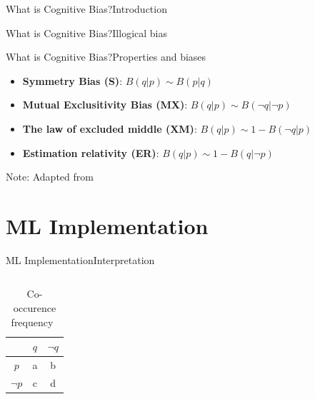 \documentclass[
	aspectratio=169,	%
	onlytextwidth,		%
	t,					%
	]{beamer}
\begin{document}
\begin{frame}[fragile]{What is Cognitive Bias?}{Introduction}
\begin{frame}[fragile]{What is Cognitive Bias?}{Illogical bias}
		 \newline

		 \newline

	\end{frame}

	\begin{frame}[fragile]{What is Cognitive Bias?}{Properties and biases}
		\vfill
	
		\begin{itemize}	
			
			\item<1-> \textbf{Symmetry Bias (S)}: \hfill $B(q|p) \sim B(p|q)$ 
			\item<2-> \textbf{Mutual Exclusitivity Bias (MX)}: \hfill $B(q|p) \sim B(\neg q| \neg p)$ 
			\item<3-> \textbf{The law of excluded middle (XM)}: \hfill $B(q|p) \sim 1- B(\neg q|p)$ 
			\item<4-> \textbf{Estimation relativity (ER)}: \hfill $B(q|p) \sim 1- B(q|\neg p)$ 
		
		\end{itemize}
	
		\vfill
		Note: Adapted from~\cite{tak10}
	\end{frame}

	\section{ML Implementation}

	\begin{frame}[fragile]{ML Implementation}{Interpretation}
		\begin{columns}

			\begin{column}[T]{.25\textwidth}
				\begin{table}
					
					\begin{tabular}{|c|c|c|}
						\hline
						& \textbf{$q$} & \textbf{$\neg q$} \\
						\hline
						\textbf{$p$} & a & b \\
						\hline
						\textbf{$\neg p$} & c & d \\
						\hline
					\end{tabular}
					\caption{Co-occurence frequency~\cite{man21}}
				

\end{table}
\end{column}
\end{columns}
\end{frame}
\end{frame}
\end{document}

